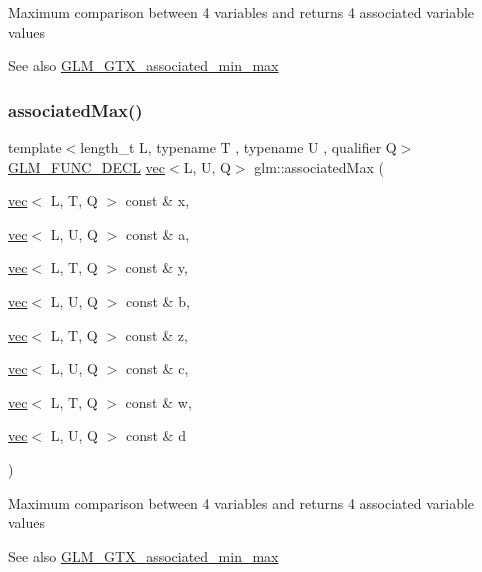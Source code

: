 Maximum comparison between 4 variables and returns 4 associated variable values \begin{DoxySeeAlso}{See also}
\hyperlink{group__gtx__associated__min__max}{G\+L\+M\+\_\+\+G\+T\+X\+\_\+associated\+\_\+min\+\_\+max} 
\end{DoxySeeAlso}
\mbox{\label{group__gtx__associated__min__max_gaf5ab0c428f8d1cd9e3b45fcfbf6423a6}} 
\subsubsection{\texorpdfstring{associated\+Max()}{associatedMax()}\hspace{0.1cm}{\footnotesize\ttfamily [10/12]}}
{\footnotesize\ttfamily template$<$length\+\_\+t L, typename T , typename U , qualifier Q$>$ \\
\hyperlink{setup_8hpp_ab2d052de21a70539923e9bcbf6e83a51}{G\+L\+M\+\_\+\+F\+U\+N\+C\+\_\+\+D\+E\+CL} \hyperlink{structglm_1_1vec}{vec}$<$L, U, Q$>$ glm\+::associated\+Max (\begin{DoxyParamCaption}\item[{\hyperlink{structglm_1_1vec}{vec}$<$ L, T, Q $>$ const \&}]{x,  }\item[{\hyperlink{structglm_1_1vec}{vec}$<$ L, U, Q $>$ const \&}]{a,  }\item[{\hyperlink{structglm_1_1vec}{vec}$<$ L, T, Q $>$ const \&}]{y,  }\item[{\hyperlink{structglm_1_1vec}{vec}$<$ L, U, Q $>$ const \&}]{b,  }\item[{\hyperlink{structglm_1_1vec}{vec}$<$ L, T, Q $>$ const \&}]{z,  }\item[{\hyperlink{structglm_1_1vec}{vec}$<$ L, U, Q $>$ const \&}]{c,  }\item[{\hyperlink{structglm_1_1vec}{vec}$<$ L, T, Q $>$ const \&}]{w,  }\item[{\hyperlink{structglm_1_1vec}{vec}$<$ L, U, Q $>$ const \&}]{d }\end{DoxyParamCaption})}

Maximum comparison between 4 variables and returns 4 associated variable values \begin{DoxySeeAlso}{See also}
\hyperlink{group__gtx__associated__min__max}{G\+L\+M\+\_\+\+G\+T\+X\+\_\+associated\+\_\+min\+\_\+max} 
\end{DoxySeeAlso}
\mbox{\label{group__gtx__associated__min__max_ga11477c2c4b5b0bfd1b72b29df3725a9d}} 
